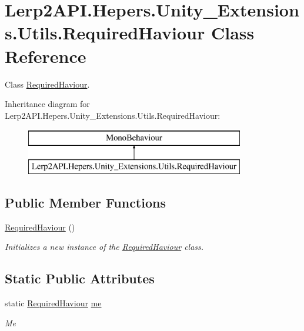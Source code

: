 \hypertarget{class_lerp2_a_p_i_1_1_hepers_1_1_unity___extensions_1_1_utils_1_1_required_haviour}{}\section{Lerp2\+A\+P\+I.\+Hepers.\+Unity\+\_\+\+Extensions.\+Utils.\+Required\+Haviour Class Reference}
\label{class_lerp2_a_p_i_1_1_hepers_1_1_unity___extensions_1_1_utils_1_1_required_haviour}


Class \hyperlink{class_lerp2_a_p_i_1_1_hepers_1_1_unity___extensions_1_1_utils_1_1_required_haviour}{Required\+Haviour}.  


Inheritance diagram for Lerp2\+A\+P\+I.\+Hepers.\+Unity\+\_\+\+Extensions.\+Utils.\+Required\+Haviour\+:\begin{figure}[H]
\begin{center}
\leavevmode
\includegraphics[height=2.000000cm]{class_lerp2_a_p_i_1_1_hepers_1_1_unity___extensions_1_1_utils_1_1_required_haviour}
\end{center}
\end{figure}
\subsection*{Public Member Functions}
\begin{DoxyCompactItemize}
\item 
\hyperlink{class_lerp2_a_p_i_1_1_hepers_1_1_unity___extensions_1_1_utils_1_1_required_haviour_a63e0e72371c9dc3e746d6e7f0c40e843}{Required\+Haviour} ()
\begin{DoxyCompactList}\small\item\em Initializes a new instance of the \hyperlink{class_lerp2_a_p_i_1_1_hepers_1_1_unity___extensions_1_1_utils_1_1_required_haviour}{Required\+Haviour} class. \end{DoxyCompactList}\end{DoxyCompactItemize}
\subsection*{Static Public Attributes}
\begin{DoxyCompactItemize}
\item 
static \hyperlink{class_lerp2_a_p_i_1_1_hepers_1_1_unity___extensions_1_1_utils_1_1_required_haviour}{Required\+Haviour} \hyperlink{class_lerp2_a_p_i_1_1_hepers_1_1_unity___extensions_1_1_utils_1_1_required_haviour_a84d4070dcd10ac971d6f56bced1bfa57}{me}
\begin{DoxyCompactList}\small\item\em Me \end{DoxyCompactList}\end{DoxyCompactItemize}
